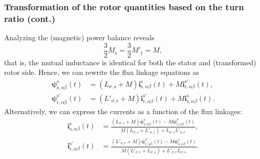 \begin{frame}
	\frametitle{Transformation of the rotor quantities based on the turn ratio (cont.)}
	\onslide<+->
	Analyzing the (magnetic) power balance reveals
	\begin{equation}
		\frac{3}{2}M_\mathrm{s} = \frac{3}{2}M'_\mathrm{r} = M,
	\end{equation}
	that is, the mutual inductance is identical for both the stator and (transformed) rotor side. \onslide<+->Hence, we can rewrite the flux linkage equations as
	\begin{align}
		\bm{\psi}^\mathrm{s}_\mathrm{s,\alpha\beta}(t)    & = (L_{\sigma,\mathrm{s}} +M) \bm{i}^\mathrm{s}_{\mathrm{s},\alpha\beta}(t) +  M\bm{i}^{\mathrm{s}'}_{\mathrm{r},\alpha\beta}(t),    \\
		\bm{\psi}^{\mathrm{s}'}_\mathrm{r,\alpha\beta}(t) & = (L'_{\sigma,\mathrm{r}} + M) \bm{i}^{\mathrm{s}'}_{\mathrm{r},\alpha\beta}(t) +  M \bm{i}^\mathrm{s}_{\mathrm{s},\alpha\beta}(t).
	\end{align}
	\onslide<+->
	Alternatively, we can express the currents as a function of the flux linkages:
	\begin{align}
		\bm{i}^\mathrm{s}_{\mathrm{s},\alpha\beta}(t)    & = \frac{(L_{\sigma,s}+M)\bm{\psi}^\mathrm{s}_\mathrm{s,\alpha\beta}(t)- M \bm{\psi}^\mathrm{s'}_\mathrm{r,\alpha\beta}(t)}{M(L_{\sigma,s}+L'_{\sigma,r}) + L_{\sigma,s}L'_{\sigma,r}},      \\
		\bm{i}^{\mathrm{s}'}_{\mathrm{r},\alpha\beta}(t) & = \frac{(L'_{\sigma,r}+M)\bm{\psi}^{\mathrm{s}'}_\mathrm{r,\alpha\beta}(t)- M \bm{\psi}^{\mathrm{s}}_\mathrm{s,\alpha\beta}(t)}{M(L'_{\sigma,r}+L_{\sigma,s}) + L'_{\sigma,r}L_{\sigma,s}}.
	\end{align}
\end{frame}

